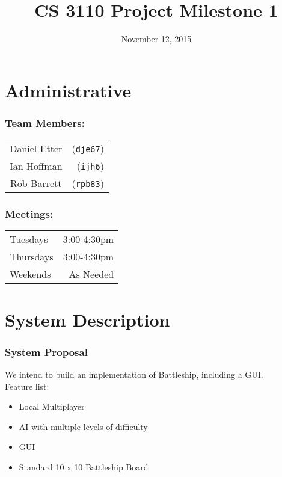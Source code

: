 \documentclass[10pt]{article}
\title{CS 3110 Project Milestone 1}
\author{}
\date{November 12, 2015}
\begin{document}
\maketitle

\part*{Administrative}
\section*{Team Members:}
\begin{tabular}{c r}
Daniel Etter & (\texttt{dje67})\\
Ian Hoffman & (\texttt{ijh6})\\
Rob Barrett & (\texttt{rpb83})\\
\end{tabular}

\section*{Meetings:}
\begin{tabular}{l r}
Tuesdays & 3:00-4:30pm \\
Thursdays & 3:00-4:30pm \\
Weekends & As Needed \\
\end{tabular}

\part*{System Description}

\section*{System Proposal}
We intend to build an implementation of Battleship, including a GUI. \\
Feature list:
\begin{itemize}
\item Local Multiplayer
\item AI with multiple levels of difficulty
\item GUI
\item Standard 10 x 10 Battleship Board
\end{itemize}
\end{document}
